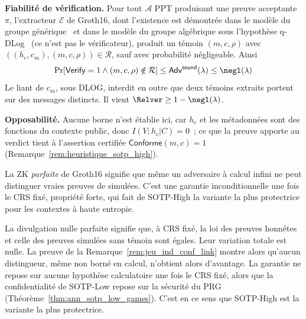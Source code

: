 \begin{sloppypar}
\begin{Preuve}
\textbf{Fiabilit\'e de v\'erification.} Pour tout $\mathcal{A}$ PPT produisant une
preuve acceptante $\pi$, l'extracteur $\mathcal{E}$ de Groth16, dont l'existence
est d\'emontr\'ee dans le mod\`ele du groupe g\'en\'erique~\cite{Groth16} et dans le
mod\`ele du groupe alg\'ebrique sous l'hypoth\`ese q-DLog~\cite{FKL18} (ce n'est pas
le v\'erificateur), produit un t\'emoin $(m,c,\rho)$ avec $((h_c,c_m),(m,c,\rho)) \in
\mathcal{R}$, sauf avec probabilit\'e n\'egligeable. Ainsi
\begin{equation}
\Pr\!\left[\mathsf{Verify}=1 \land (m,c,\rho)\notin\mathcal{R}\right]
\leq \mathsf{Adv}^{\mathsf{sound}}(\lambda) \leq \negl(\lambda)
\end{equation}
Le liant de $c_m$, sous DLOG, interdit en outre que deux t\'emoins extraits portent sur
des messages distincts. Il vient $\Relver \geq 1-\negl(\lambda)$.

\textbf{Opposabilit\'e.} Aucune borne n'est \'etablie ici, car $h_c$ et les
m\'etadonn\'ees sont des fonctions du contexte public, donc $I(V;h_c|C) = 0$~; ce que
la preuve apporte au verdict tient \`a l'assertion certifi\'ee
$\mathsf{Conforme}(m,c) = 1$ (Remarque~\ref{rem:heuristique_sotp_high}).
\end{Preuve}

\begin{remark}[La ZK parfaite] La ZK \emph{parfaite}
de Groth16 signifie que m\^eme un adversaire \`a calcul infini ne peut
distinguer vraies preuves de simul\'ees. C'est une garantie inconditionnelle
une fois le CRS fix\'e, propri\'et\'e forte, qui fait de SOTP-High
la variante la plus protectrice pour les contextes \`a haute entropie.
\end{remark}

\begin{Preuve}
La divulgation nulle parfaite signifie que, \`a CRS fix\'e, la loi des preuves
honn\^etes et celle des preuves simul\'ees sans t\'emoin sont \'egales. Leur variation
totale est nulle. La preuve de la Remarque~\ref{rem:jeu_ind_conf_link} montre alors
qu'aucun distingueur, m\^eme non born\'e en calcul, n'obtient alors d'avantage. La
garantie ne repose sur aucune hypoth\`ese calculatoire une fois le CRS fix\'e,
alors que la confidentialit\'e de SOTP-Low repose sur la s\'ecurit\'e du PRG
(Th\'eor\`eme~\ref{thm:ann_sotp_low_games}). C'est en ce sens que SOTP-High est la
variante la plus protectrice.
\end{Preuve}
\end{sloppypar}

